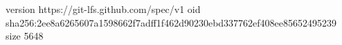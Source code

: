 version https://git-lfs.github.com/spec/v1
oid sha256:2ee8a6265607a1598662f7adff1f462d90230ebd337762ef408ee85652495239
size 5648
